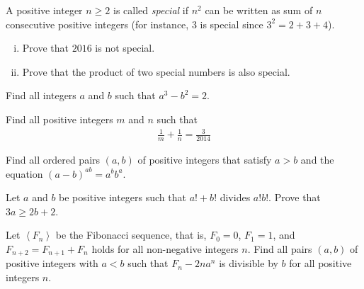 \documentclass[problems.tex]{subfile}
\begin{document}
	\begin{problem}
		A positive integer $n \geq 2$ is called \textit{special} if $n^2$ can be written as sum of $n$ consecutive positive integers (for instance, $3$ is special since $3^2 = 2 + 3 + 4$).
		\begin{enumerate}[(i)]
			\item Prove that $2016$ is not special.
			\item Prove that the product of two special numbers is also special.
		\end{enumerate}
	\end{problem}

	\begin{problem}
		Find all integers $a$ and $b$ such that $a^3 - b^2 = 2$.
	\end{problem}

	\begin{problem}
		Find all positive integers $m$ and $n$ such that
		\begin{align*}
			\frac{1}{m} + \frac{1}{n} = \frac{3}{2014}
		\end{align*}
	\end{problem}

	\begin{problem}
		Find all ordered pairs $(a,b)$ of positive integers that satisfy $a>b$ and the equation $(a-b)^{ab}=a^bb^a$. %
	\end{problem}

	\begin{problem}
		Let $a$ and $b$ be positive integers such that $a! + b!$ divides $a!b!$. Prove that $3a \ge 2b + 2$. %
	\end{problem}

	\begin{problem}
		Let $\left< F_n\right>$ be the Fibonacci sequence, that is, $F_0=0$, $F_1=1$, and $F_{n+2}=F_{n+1}+F_{n}$ holds for all non-negative integers $n$.
		Find all pairs $(a,b)$ of positive integers with $a < b$ such that $F_n-2na^n$ is divisible by $b$ for all positive integers $n$. %
	\end{problem}
\end{document}
